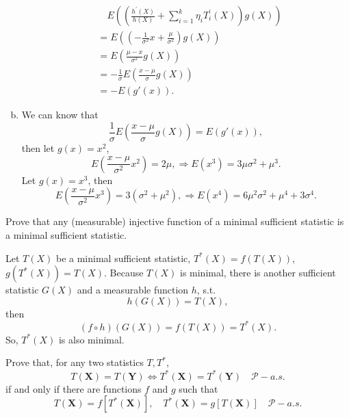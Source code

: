 \begin{solution}
\begin{enumerate}[(a)]
        \[
            \begin{aligned}
                &\quad E\left(\left(\frac{h^{\prime}(X)}{h(X)}+\sum_{i=1}^{k} \eta_{i} T_{i}^{\prime}(X)\right) g(X)\right)\\
                &=E\left(\left(-\frac{1}{\sigma^2}x+\frac{\mu}{\sigma^2}\right) g(X)\right)\\
                &=E\left(\frac{\mu-x}{\sigma^2} g(X)\right)\\
                &=-\frac{1}{\sigma} E\left(\frac{x-\mu}{\sigma} g(X)\right)\\
                &=-E(g'(x)). 
            \end{aligned}
        \]
        \item We can know that \[
            \frac{1}{\sigma} E\left(\frac{x-\mu}{\sigma} g(X)\right)=E(g'(x)), 
        \]
        then let $g(x)=x^2$, 
        \[
            E\left(\frac{x-\mu}{\sigma^2}x^2\right)=2\mu, \Rightarrow E(x^3)=3\mu\sigma^2+\mu^3. 
        \]
        Let $g(x)=x^3$, then
        \[
            E\left(\frac{x-\mu}{\sigma^2}x^3\right)=3(\sigma^2+\mu^2), \Rightarrow E(x^4)=6\mu^2\sigma^2+\mu^4+3\sigma^4. 
        \]
    \end{enumerate}
\end{solution}

\begin{ex}
    Prove that any (measurable) injective function of a minimal sufficient statistic is a minimal sufficient statistic. 
\end{ex}

\begin{solution}
    Let $T(X)$ be a minimal sufficient statistic, $T^*(X)=f(T(X))$, $g(T^*(X))=T(X)$. Because $T(X)$ is minimal, there is another sufficient statistic $G(X)$ and a measurable function $h$, s.t. 
    \[
        h(G(X))=T(X), 
    \]
    then
    \[
        (f\circ h)(G(X))=f(T(X))=T^*(X). 
    \]
    So, $T^*(X)$ is also minimal. 
\end{solution}

\begin{ex}
    Prove that, for any two statistics \(T, T^{*}\),
    \[
    T(\mathbf{X})=T(\mathbf{Y}) \Leftrightarrow T^{*}(\mathbf{X})=T^{*}(\mathbf{Y}) \quad \mathcal{P}-a.s.
    \]
    if and only if there are functions \(f\) and \(g\) such that
    \[
    T(\mathbf{X})=f\left[T^{*}(\mathbf{X})\right], \quad T^{*}(\mathbf{X})=g[T(\mathbf{X})] \quad \mathcal{P}-a.s.
    \]
\end{ex}

